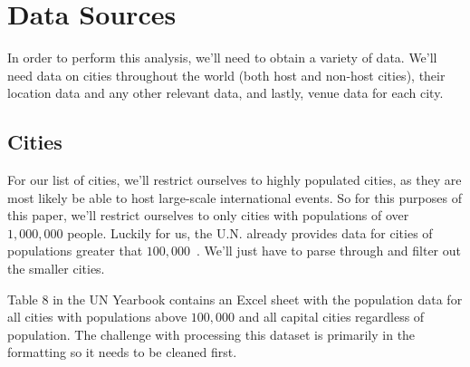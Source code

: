 \documentclass[
 reprint,
 amsmath,amssymb,
 aps,
prb,
floatfix
]{revtex4-2}
\begin{document}
\section{Data Sources}
    In order to perform this analysis, we'll need to obtain a variety of data. We'll need data on cities throughout the world (both host and non-host cities), their location data and any other relevant data, and lastly, venue data for each city.
    \subsection{Cities}
    For our list of cities, we'll restrict ourselves to highly populated cities, as they are most likely be able to host large-scale international events. So for this purposes of this paper, we'll restrict ourselves to only cities with populations of over $1,000,000$ people. Luckily for us, the U.N. already provides data for cities of populations greater that $100,000$~\cite{un_pop}. We'll just have to parse through and filter out the smaller cities.

    Table 8 in the UN Yearbook contains an Excel sheet with the population data for all cities with populations above $100,000$ and all capital cities regardless of population. The challenge with processing this dataset is primarily in the formatting so it needs to be cleaned first.
\end{document}
